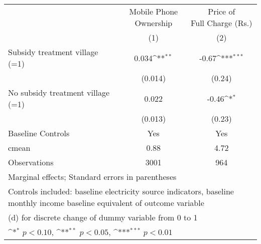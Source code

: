\def\sym#1{\ifmmode^{#1}\else\(^{#1}\)\fi}
\begin{adjustbox}{max
width={\textwidth},caption={Endline mobile phone outcomes},nofloat=table}
\begin{tabular}{l*{2}{c}}
\toprule
& \shortstack{Mobile Phone\\Ownership} & \shortstack{Price of\\Full Charge (Rs.)}\\
& (1) & (2)\\ \hline
Subsidy treatment village (=1)&    0.034\sym{**} &    -0.67\sym{***}\\
                &  (0.014)         &   (0.24)         \\
No subsidy treatment village (=1)&    0.022         &    -0.46\sym{*}  \\
                &  (0.013)         &   (0.23)         \\
Baseline Controls &      Yes         &      Yes         \\
\midrule
cmean           &     0.88         &     4.72         \\
Observations    &     3001         &      964         \\
\bottomrule
\multicolumn{3}{p{\textwidth}}{\centering \footnotesize Marginal effects; Standard errors in parentheses}\\
\multicolumn{3}{p{\textwidth}}{\centering \footnotesize Controls included: baseline electricity source indicators, baseline monthly income baseline equivalent of outcome variable}\\
\multicolumn{3}{p{\textwidth}}{\centering \footnotesize  (d) for discrete change of dummy variable from 0 to 1}\\
\multicolumn{3}{p{\textwidth}}{\centering \footnotesize \sym{*} \(p<0.10\), \sym{**} \(p<0.05\), \sym{***} \(p<0.01\)}\\
\end{tabular}\end{adjustbox}
